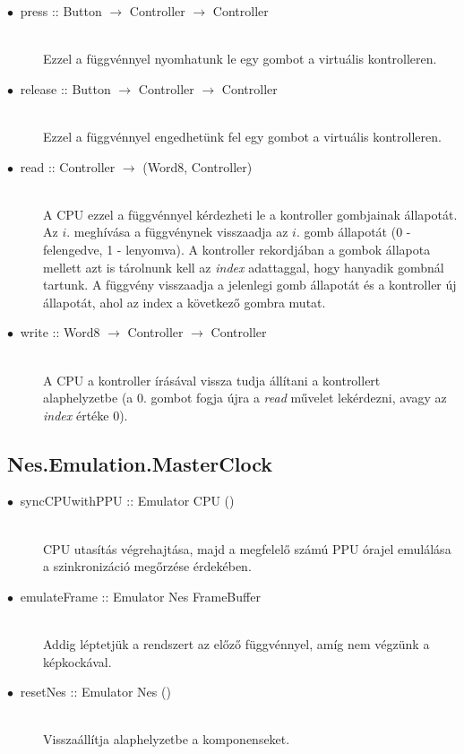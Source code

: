 \begin{description}
	\item[$\bullet\:$ press :: Button $\rightarrow$ Controller $\rightarrow$ Controller] \hfill \\
	Ezzel a függvénnyel nyomhatunk le egy gombot a virtuális kontrolleren.
	\item[$\bullet\:$ release :: Button $\rightarrow$ Controller $\rightarrow$ Controller] \hfill \\
	Ezzel a függvénnyel engedhetünk fel egy gombot a virtuális kontrolleren.
	\item[$\bullet\:$ read :: Controller $\rightarrow$ (Word8, Controller)] \hfill \\
		A CPU ezzel a függvénnyel kérdezheti le a kontroller gombjainak állapotát.
		Az $i.$ meghívása a függvénynek visszaadja az $i.$ gomb állapotát (0 - felengedve, 1 - lenyomva). A kontroller rekordjában a gombok állapota mellett azt is tárolnunk kell az \emph{index} adattaggal, hogy hanyadik gombnál tartunk. A függvény visszaadja a jelenlegi gomb állapotát és a kontroller új állapotát, ahol az index a következő gombra mutat. 
	\item[$\bullet\:$ write :: Word8 $\rightarrow$ Controller $\rightarrow$ Controller] \hfill \\
		A CPU a kontroller írásával vissza tudja állítani a kontrollert alaphelyzetbe (a 0. gombot fogja újra a \emph{read} művelet lekérdezni, avagy az \emph{index} értéke 0).
	
\end{description}

\subsection{Nes.Emulation.MasterClock}

\begin{description}
	\item[$\bullet\:$ syncCPUwithPPU :: Emulator CPU ()] \hfill \\
	CPU utasítás végrehajtása, majd a megfelelő számú PPU órajel emulálása a szinkronizáció megőrzése érdekében.
	\item[$\bullet\:$ emulateFrame :: Emulator Nes FrameBuffer] \hfill \\
	Addig léptetjük a rendszert az előző függvénnyel, amíg nem végzünk a képkockával.
	\item[$\bullet\:$ resetNes :: Emulator Nes ()] \hfill \\
	Visszaállítja alaphelyzetbe a komponenseket. 
\end{description}

